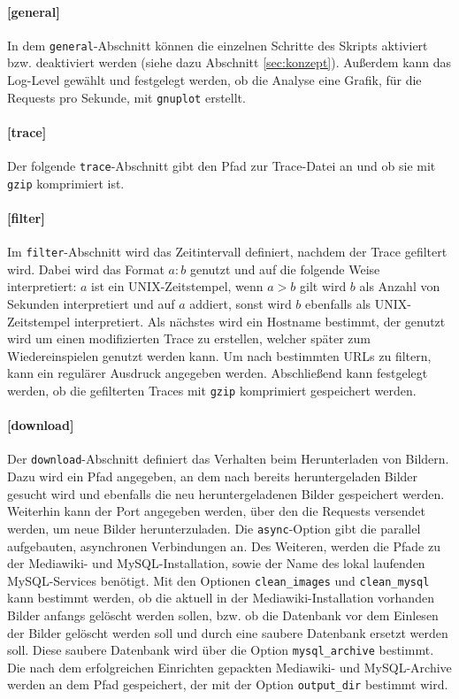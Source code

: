 \paragraph{[general]}

In dem \texttt{general}-Abschnitt können die einzelnen Schritte des Skripts aktiviert bzw. deaktiviert werden (siehe dazu Abschnitt \ref{sec:konzept}). Außerdem kann das Log-Level gewählt und festgelegt werden, ob die Analyse eine Grafik, für die Requests pro Sekunde, mit \texttt{gnuplot} erstellt.

\paragraph{[trace]}

Der folgende \texttt{trace}-Abschnitt gibt den Pfad zur Trace-Datei an und ob sie mit \texttt{gzip} komprimiert ist.

\paragraph{[filter]}

Im \texttt{filter}-Abschnitt wird das Zeitintervall definiert, nachdem der Trace gefiltert wird. Dabei wird das Format $a:b$ genutzt und auf die folgende Weise interpretiert: $a$ ist ein UNIX-Zeitstempel, wenn $a > b$ gilt wird $b$ als Anzahl von Sekunden interpretiert und auf $a$ addiert, sonst wird $b$ ebenfalls als UNIX-Zeitstempel interpretiert. Als nächstes wird ein Hostname bestimmt, der genutzt wird um einen modifizierten Trace zu erstellen, welcher später zum Wiedereinspielen genutzt werden kann. Um nach bestimmten URLs zu filtern, kann ein regulärer Ausdruck angegeben werden. Abschließend kann festgelegt werden, ob die gefilterten Traces mit \texttt{gzip} komprimiert gespeichert werden.

\paragraph{[download]}

Der \texttt{download}-Abschnitt definiert das Verhalten beim Herunterladen von Bildern. Dazu wird ein Pfad angegeben, an dem nach bereits heruntergeladen Bilder gesucht wird und ebenfalls die neu heruntergeladenen Bilder gespeichert werden. Weiterhin kann der Port angegeben werden, über den die Requests versendet werden, um neue Bilder herunterzuladen. Die \texttt{async}-Option gibt die parallel aufgebauten, asynchronen Verbindungen an. Des Weiteren, werden die Pfade zu der Mediawiki- und MySQL-Installation, sowie der Name des lokal laufenden MySQL-Services benötigt. Mit den Optionen \texttt{clean\_images} und \texttt{clean\_mysql} kann bestimmt werden, ob die aktuell in der Mediawiki-Installation vorhanden Bilder anfangs gelöscht werden sollen, bzw. ob die Datenbank vor dem Einlesen der Bilder gelöscht werden soll und durch eine \glqq{}saubere\grqq{} Datenbank ersetzt werden soll. Diese \glqq{}saubere\grqq{} Datenbank wird über die Option \texttt{mysql\_archive} bestimmt. Die nach dem erfolgreichen Einrichten gepackten Mediawiki- und MySQL-Archive werden an dem Pfad gespeichert, der mit der Option \texttt{output\_dir} bestimmt wird.

